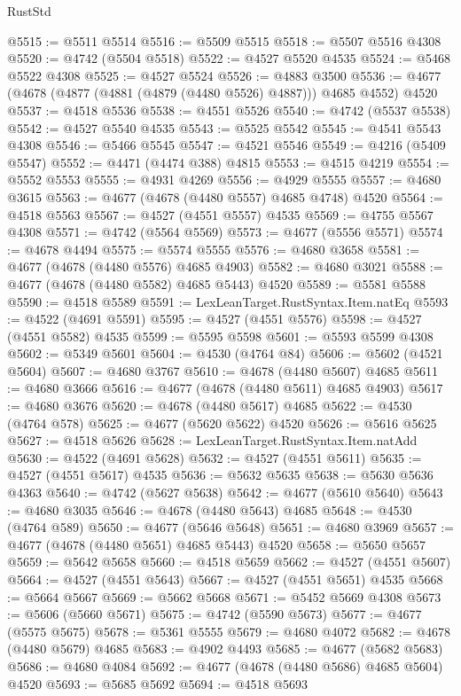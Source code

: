 \begin{lexlean}{RustStd}
\begin{coremodule}
@5515 := @5511 @5514
@5516 := @5509 @5515
@5518 := @5507 @5516 @4308
@5520 := @4742 (@5504 @5518)
@5522 := @4527 @5520 @4535
@5524 := @5468 @5522 @4308
@5525 := @4527 @5524
@5526 := @4883 @3500
@5536 := @4677 (@4678 (@4877 (@4881 (@4879 (@4480 @5526) @4887))) @4685 @4552) @4520
@5537 := @4518 @5536
@5538 := @4551 @5526
@5540 := @4742 (@5537 @5538)
@5542 := @4527 @5540 @4535
@5543 := @5525 @5542
@5545 := @4541 @5543 @4308
@5546 := @5466 @5545
@5547 := @4521 @5546
@5549 := @4216 (@5409 @5547)
@5552 := @4471 (@4474 @388) @4815
@5553 := @4515 @4219
@5554 := @5552 @5553
@5555 := @4931 @4269
@5556 := @4929 @5555
@5557 := @4680 @3615
@5563 := @4677 (@4678 (@4480 @5557) @4685 @4748) @4520
@5564 := @4518 @5563
@5567 := @4527 (@4551 @5557) @4535
@5569 := @4755 @5567 @4308
@5571 := @4742 (@5564 @5569)
@5573 := @4677 (@5556 @5571)
@5574 := @4678 @4494
@5575 := @5574 @5555
@5576 := @4680 @3658
@5581 := @4677 (@4678 (@4480 @5576) @4685 @4903)
@5582 := @4680 @3021
@5588 := @4677 (@4678 (@4480 @5582) @4685 @5443) @4520
@5589 := @5581 @5588
@5590 := @4518 @5589
@5591 := LexLeanTarget.RustSyntax.Item.natEq
@5593 := @4522 (@4691 @5591)
@5595 := @4527 (@4551 @5576)
@5598 := @4527 (@4551 @5582) @4535
@5599 := @5595 @5598
@5601 := @5593 @5599 @4308
@5602 := @5349 @5601
@5604 := @4530 (@4764 @84)
@5606 := @5602 (@4521 @5604)
@5607 := @4680 @3767
@5610 := @4678 (@4480 @5607) @4685
@5611 := @4680 @3666
@5616 := @4677 (@4678 (@4480 @5611) @4685 @4903)
@5617 := @4680 @3676
@5620 := @4678 (@4480 @5617) @4685
@5622 := @4530 (@4764 @578)
@5625 := @4677 (@5620 @5622) @4520
@5626 := @5616 @5625
@5627 := @4518 @5626
@5628 := LexLeanTarget.RustSyntax.Item.natAdd
@5630 := @4522 (@4691 @5628)
@5632 := @4527 (@4551 @5611)
@5635 := @4527 (@4551 @5617) @4535
@5636 := @5632 @5635
@5638 := @5630 @5636 @4363
@5640 := @4742 (@5627 @5638)
@5642 := @4677 (@5610 @5640)
@5643 := @4680 @3035
@5646 := @4678 (@4480 @5643) @4685
@5648 := @4530 (@4764 @589)
@5650 := @4677 (@5646 @5648)
@5651 := @4680 @3969
@5657 := @4677 (@4678 (@4480 @5651) @4685 @5443) @4520
@5658 := @5650 @5657
@5659 := @5642 @5658
@5660 := @4518 @5659
@5662 := @4527 (@4551 @5607)
@5664 := @4527 (@4551 @5643)
@5667 := @4527 (@4551 @5651) @4535
@5668 := @5664 @5667
@5669 := @5662 @5668
@5671 := @5452 @5669 @4308
@5673 := @5606 (@5660 @5671)
@5675 := @4742 (@5590 @5673)
@5677 := @4677 (@5575 @5675)
@5678 := @5361 @5555
@5679 := @4680 @4072
@5682 := @4678 (@4480 @5679) @4685
@5683 := @4902 @4493
@5685 := @4677 (@5682 @5683)
@5686 := @4680 @4084
@5692 := @4677 (@4678 (@4480 @5686) @4685 @5604) @4520
@5693 := @5685 @5692
@5694 := @4518 @5693

\end{coremodule}
\end{lexlean}

